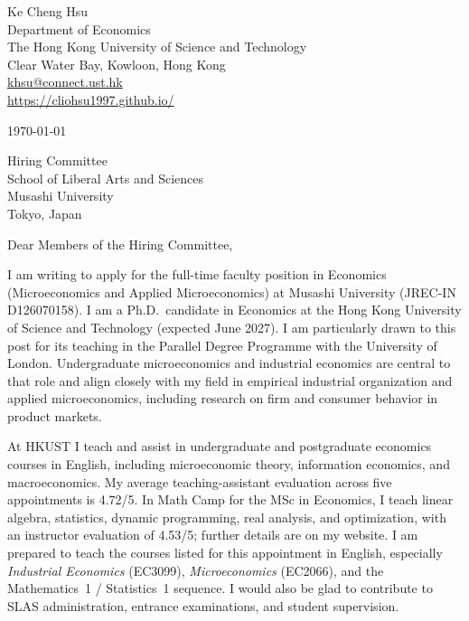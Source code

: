 \documentclass[11pt]{article}
\begin{document}
\begin{flushleft}
Ke Cheng Hsu \\
Department of Economics \\
The Hong Kong University of Science and Technology \\
Clear Water Bay, Kowloon, Hong Kong \\
\href{mailto:khsu@connect.ust.hk}{khsu@connect.ust.hk} \\
\href{https://cliohsu1997.github.io/}{https://cliohsu1997.github.io/}
\end{flushleft}

\vspace{0.1em}
\today

\vspace{0.3em}
Hiring Committee \\
School of Liberal Arts and Sciences \\
Musashi University \\
Tokyo, Japan

\vspace{0.3em}
Dear Members of the Hiring Committee,

I am writing to apply for the full-time faculty position in Economics (Microeconomics and Applied Microeconomics) at Musashi University (JREC-IN D126070158). I am a Ph.D.\ candidate in Economics at the Hong Kong University of Science and Technology (expected June 2027). I am particularly drawn to this post for its teaching in the Parallel Degree Programme with the University of London. Undergraduate microeconomics and industrial economics are central to that role and align closely with my field in empirical industrial organization and applied microeconomics, including research on firm and consumer behavior in product markets.

At HKUST I teach and assist in undergraduate and postgraduate economics courses in English, including microeconomic theory, information economics, and macroeconomics. My average teaching-assistant evaluation across five appointments is 4.72/5. In Math Camp for the MSc in Economics, I teach linear algebra, statistics, dynamic programming, real analysis, and optimization, with an instructor evaluation of 4.53/5; further details are on my website. I am prepared to teach the courses listed for this appointment in English, especially \emph{Industrial Economics} (EC3099), \emph{Microeconomics} (EC2066), and the Mathematics~1 / Statistics~1 sequence. I would also be glad to contribute to SLAS administration, entrance examinations, and student supervision.
\end{document}
